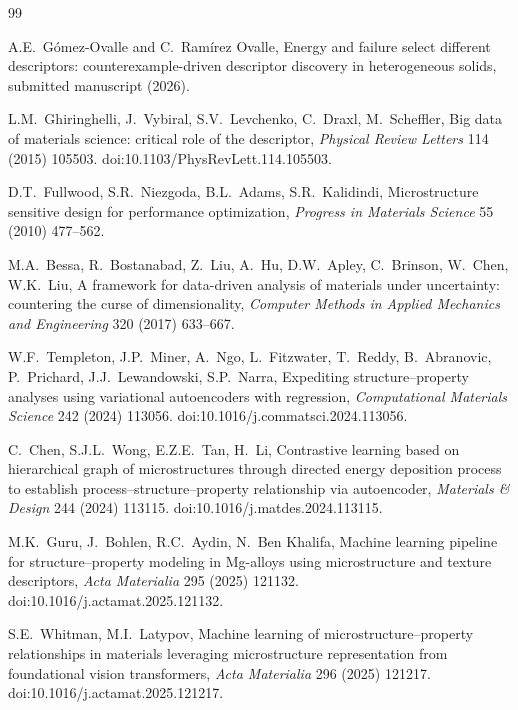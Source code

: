 \documentclass[preprint,11pt,a4paper]{elsarticle}
\begin{document}
\begin{thebibliography}{99}

A.E.~G\'omez-Ovalle and C.~Ram\'irez Ovalle,
\newblock Energy and failure select different descriptors: counterexample-driven
descriptor discovery in heterogeneous solids,
\newblock submitted manuscript (2026).

L.M.~Ghiringhelli, J.~Vybiral, S.V.~Levchenko, C.~Draxl, M.~Scheffler,
\newblock Big data of materials science: critical role of the descriptor,
\newblock \emph{Physical Review Letters} 114 (2015) 105503.
\newblock doi:10.1103/PhysRevLett.114.105503.

D.T.~Fullwood, S.R.~Niezgoda, B.L.~Adams, S.R.~Kalidindi,
\newblock Microstructure sensitive design for performance optimization,
\newblock \emph{Progress in Materials Science} 55 (2010) 477--562.

M.A.~Bessa, R.~Bostanabad, Z.~Liu, A.~Hu, D.W.~Apley, C.~Brinson,
W.~Chen, W.K.~Liu,
\newblock A framework for data-driven analysis of materials under uncertainty:
countering the curse of dimensionality,
\newblock \emph{Computer Methods in Applied Mechanics and Engineering}
320 (2017) 633--667.

W.F.~Templeton, J.P.~Miner, A.~Ngo, L.~Fitzwater, T.~Reddy, B.~Abranovic,
P.~Prichard, J.J.~Lewandowski, S.P.~Narra,
\newblock Expediting structure--property analyses using variational autoencoders
with regression,
\newblock \emph{Computational Materials Science} 242 (2024) 113056.
\newblock doi:10.1016/j.commatsci.2024.113056.

C.~Chen, S.J.L.~Wong, E.Z.E.~Tan, H.~Li,
\newblock Contrastive learning based on hierarchical graph of microstructures
through directed energy deposition process to establish process--structure--property
relationship via autoencoder,
\newblock \emph{Materials \& Design} 244 (2024) 113115.
\newblock doi:10.1016/j.matdes.2024.113115.

M.K.~Guru, J.~Bohlen, R.C.~Aydin, N.~Ben Khalifa,
\newblock Machine learning pipeline for structure--property modeling in Mg-alloys
using microstructure and texture descriptors,
\newblock \emph{Acta Materialia} 295 (2025) 121132.
\newblock doi:10.1016/j.actamat.2025.121132.

S.E.~Whitman, M.I.~Latypov,
\newblock Machine learning of microstructure--property relationships in materials
leveraging microstructure representation from foundational vision transformers,
\newblock \emph{Acta Materialia} 296 (2025) 121217.
\newblock doi:10.1016/j.actamat.2025.121217.


\end{thebibliography}
\end{document}
